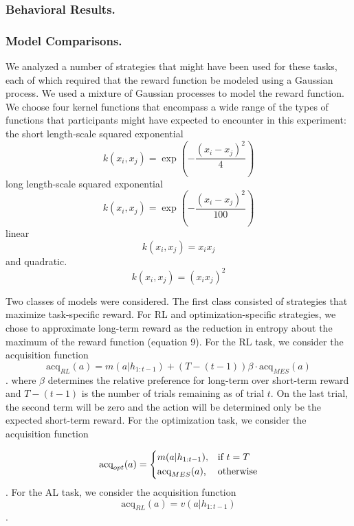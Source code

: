 \documentclass[10pt,letterpaper]{article}
\begin{document}
	\subsubsection{Behavioral Results.}
	
	\subsubsection{Model Comparisons.}
	
	We analyzed a number of strategies that might have been used for these tasks, each of which required that the reward function be modeled using a Gaussian process. We used a mixture of Gaussian processes \citep{Tresp} to model the reward function. We choose four kernel functions that encompass a wide range of the types of functions that participants might have expected to encounter in this experiment: the short length-scale squared exponential
	\begin{equation}
	k(x_{i},x_{j}) = \exp(-\frac{(x_{i}-x_{j})^{2}}{4})
	\end{equation}
	long length-scale squared exponential
	\begin{equation}
	k(x_{i},x_{j}) = \exp(-\frac{(x_{i}-x_{j})^{2}}{100})
	\end{equation}
	linear
	\begin{equation}
	k(x_{i}, x_{j}) = x_{i}x_{j}
	\end{equation}
	and quadratic.
	\begin{equation}
	k(x_{i}, x_{j}) = (x_{i}x_{j})^{2}
	\end{equation}
	
	Two classes of models were considered. The first class consisted of strategies that maximize task-specific reward. For RL and optimization-specific strategies, we chose to approximate long-term reward as the reduction in entropy about the maximum of the reward function (equation 9). For the RL task, we consider the acquisition function
	$$\text{acq}_{RL}(a)  = m(a|h_{1:t-1}) + (T-(t-1))\beta \cdot \text{acq}_{MES}(a)$$.
	where $\beta$ determines the relative preference for long-term over short-term reward and $T-(t-1)$ is the number of trials remaining as of trial $t$. On the last trial, the second term will be zero and the action will be determined only be the expected short-term reward. For the optimization task, we consider the acquisition function

	\[\text{acq}_{opt}(a) = 
	\begin{dcases}
	m(a|h_{1:t-1}), & \text{if } t = T\\
	\text{acq}_{MES}(a), & \text{otherwise}
	\end{dcases}
	\]
	.
	For the AL task, we consider the acquisition function
	$$\text{acq}_{RL}(a)  = v(a|h_{1:t-1})$$.
	
\end{document}
